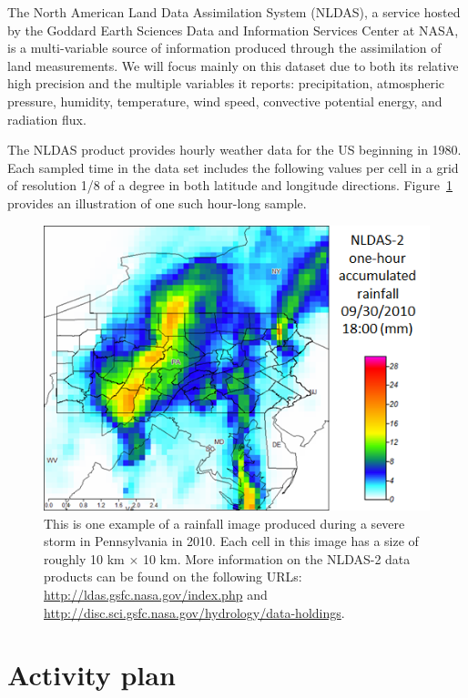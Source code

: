 \documentclass{article}
\begin{document}
The North American Land Data Assimilation System (NLDAS), a service hosted by the Goddard Earth Sciences Data and Information Services Center at NASA, is a multi-variable source of information produced through the assimilation of land measurements. We will focus mainly on this dataset due to both its relative high precision and the multiple variables it reports: precipitation, atmospheric pressure, humidity, temperature, wind speed, convective potential energy, and radiation flux.

The NLDAS product provides hourly weather data for the US beginning in 1980. Each sampled time in the data set includes the following values per cell in a grid of resolution 1/8 of a degree in both latitude and longitude directions. Figure~\ref{fig:example_rainfall} provides an illustration of one such hour-long sample.


\begin{figure}[ht]
\vskip 0.2in
\begin{center}
\centerline{\includegraphics[width=\columnwidth]{weather.png}}
\caption{This is one example of a rainfall image produced during a severe storm in Pennsylvania in 2010. Each cell in this image has a size of roughly 10 km $\times$ 10 km. More information on the NLDAS-2 data products can be found on the following URLs: \url{http://ldas.gsfc.nasa.gov/index.php} and \url{http://disc.sci.gsfc.nasa.gov/hydrology/data-holdings}.}
\label{fig:example_rainfall}
\end{center}
\vskip -0.2in
\end{figure}

\section{Activity plan}
\end{document}
